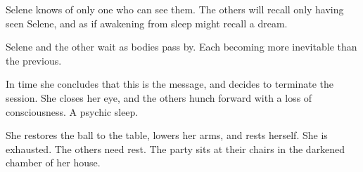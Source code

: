 Selene knows of only one who can see them.  The others will recall
only having seen Selene, and as if awakening from sleep might recall a
dream.

Selene and the other wait as bodies pass by.  Each becoming more
inevitable than the previous.  

\vfill
\break

In time she concludes that this is the message, and decides to
terminate the session.  She closes her eye, and the others hunch
forward with a loss of consciousness.  A psychic sleep.

She restores the ball to the table, lowers her arms, and rests
herself.  She is exhausted.  The others need rest.  The party sits at
their chairs in the darkened chamber of her house.  

\bye

